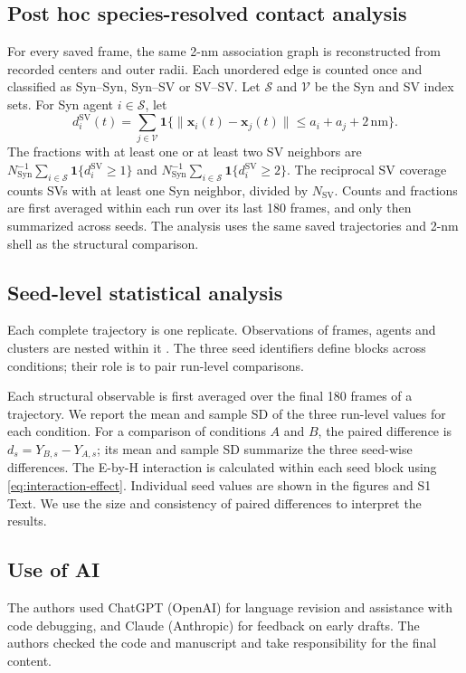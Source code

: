 \documentclass[11pt,letterpaper]{article}
\newcommand{\Syn}{\mathrm{Syn}}
\newcommand{\SV}{\mathrm{SV}}
\begin{document}
\subsection{Post hoc species-resolved contact analysis}
For every saved frame, the same 2-nm association graph is reconstructed
from recorded centers and outer radii. Each unordered edge is counted
once and classified as Syn--Syn, Syn--SV or SV--SV.
Let $\mathcal S$ and $\mathcal V$ be the Syn and SV index sets.
For Syn agent $i\in\mathcal S$, let
\[
 d_i^{\SV}(t)=\sum_{j\in\mathcal V}
 \mathbf1\{\|\bm x_i(t)-\bm x_j(t)\|\leq a_i+a_j+2\,\mathrm{nm}\}.
\]
The fractions with at least one or at least two SV neighbors are
$N_{\Syn}^{-1}\sum_{i\in\mathcal S}\mathbf1\{d_i^{\SV}\geq1\}$
and $N_{\Syn}^{-1}\sum_{i\in\mathcal S}\mathbf1\{d_i^{\SV}\geq2\}$.
The reciprocal SV coverage counts SVs with at least one Syn neighbor,
divided by $N_{\SV}$. Counts and fractions are first averaged within each
run over its last 180 frames, and only then summarized across seeds.
The analysis uses the same saved trajectories and 2-nm shell as the
structural comparison.

\subsection{Seed-level statistical analysis}
Each complete trajectory is one replicate. Observations of frames,
agents and clusters are nested within it \cite{Hurlbert1984}. The
three seed identifiers define blocks across conditions; their role
is to pair run-level comparisons.

Each structural observable is first averaged over the final 180 frames of
a trajectory. We report the mean and sample SD of the three run-level
values for each condition. For a comparison of conditions $A$ and $B$,
the paired difference is $d_s=Y_{B,s}-Y_{A,s}$; its mean and sample SD
summarize the three seed-wise differences. The E-by-H interaction is
calculated within each seed block using \cref{eq:interaction-effect}.
Individual seed values are shown in the figures and S1 Text. We use
the size and consistency of paired differences to interpret the results.

\subsection{Use of AI}
The authors used ChatGPT (OpenAI) for language revision and assistance
with code debugging, and Claude (Anthropic) for feedback on early drafts.
The authors checked the code and manuscript and take responsibility for
the final content.
\end{document}
